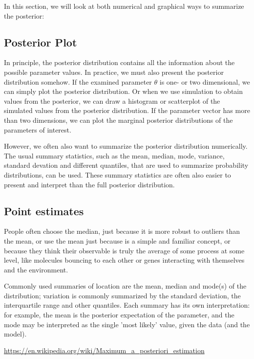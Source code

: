In this section, we will look at both numerical and graphical ways to summarize the posterior:




\subsection{Posterior Plot}

In principle, the posterior distribution contains all the information about the possible parameter values. In practice, we must also present the posterior distribution somehow. If the examined parameter $\theta$
  is one- or two dimensional, we can simply plot the posterior distribution. Or when we use simulation to obtain values from the posterior, we can draw a histogram or scatterplot of the simulated values from the posterior distribution. If the parameter vector has more than two dimensions, we can plot the marginal posterior distributions of the parameters of interest.
  
 However, we often also want to summarize the posterior distribution numerically. The usual summary statistics, such as the mean, median, mode, variance, standard devation and different quantiles, that are used to summarize probability distributions, can be used. These summary statistics are often also easier to present and interpret than the full posterior distribution.

\subsection{Point estimates}

People often choose the median, just because it is more robust to outliers than the mean, or use the mean just because is a simple and familiar concept, or because they think their observable is truly the average of some process at some level, like molecules bouncing to each other or genes interacting with themselves and the environment.

Commonly used summaries of location are the mean, median and mode(s) of the distribution; variation is commonly summarized by the standard deviation, the interquartile range and other quantiles. Each summary has its own interpretation: for example, the mean is the posterior expectation of the parameter, and the mode may be interpreted as the single 'most likely' value, given the data (and the model).

\url{https://en.wikipedia.org/wiki/Maximum_a_posteriori_estimation}

